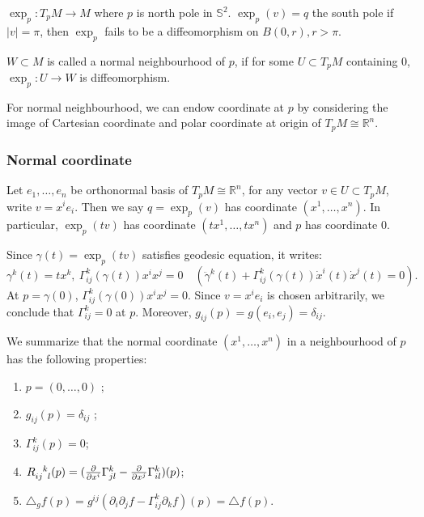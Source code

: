 \begin{example}
    \(\exp_p\colon T_p M\to M\) where \(p\) is north pole in \(\mathbb{S}^2\).
    \(\exp_p(v)=q\) the south pole if \(|v|=\pi\), then \(\exp_p\) fails to be a
    diffeomorphism on \(B(0,r),r>\pi\).
\end{example}

\begin{definition}
    \(W\subset M\) is called a normal neighbourhood of \(p\), if for some \(U\subset 
    T_p M\) containing 0, \(\exp_p\colon U\to W\) is diffeomorphism.
\end{definition}

For normal neighbourhood, we can endow coordinate at \(p\) by considering the image
of Cartesian coordinate and polar coordinate at origin of \(T_p M\cong \mathbb{R}^n\).

\subsubsection*{Normal coordinate}
Let \(e_1,\ldots,e_n\) be orthonormal basis of \(T_p M\cong \mathbb{R}^n\), for any
vector \(v\in U\subset T_p M\), write \(v=x^i e_i\).
Then we say \(q=\exp_p(v)\) has coordinate \((x^1,\ldots,x^n)\). In particular,
\(\exp_p(tv)\) has coordinate \((tx^1,\ldots,tx^n)\) and \(p\) has coordinate \(0\).

Since \(\gamma(t)=\exp_p(tv)\) satisfies geodesic equation, it writes: \[
    \gamma^k(t)=tx^k,\ \Gamma_{ij}^k(\gamma(t))x^i x^j=0\quad
    (\ddot \gamma^k(t)+\Gamma_{ij}^k(\gamma(t))\dot x^i(t)\dot x^j(t)=0)
.\] At \(p=\gamma(0)\), \(\Gamma_{ij}^k(\gamma(0))x^i x^j=0\). Since \(v=x^i e_i\) is
chosen arbitrarily, we conclude that \(\Gamma_{ij}^k=0\) at \(p\).
Moreover, \(g_{ij}(p)=g(e_i,e_j)=\delta_{ij}\).

We summarize that the normal coordinate \((x^1,\ldots,x^n)\) in a neighbourhood of 
\(p\) has the following properties:
\begin{enumerate}[(1)]
\item \(p=(0,\ldots,0)\) ;
\item \(g_{ij}(p)=\delta_{ij}\) ;
\item \(\Gamma_{ij}^k(p)=0\);
\item \(\tensor{R}{_{ij}^k_l}(p)=(\pdv{x^i}\Gamma_{jl}^k-\pdv{x^j}\Gamma_{il}^k)(p)\);
\item \(\triangle_g f(p)=g^{ij}(\partial_i \partial_j f-\Gamma_{ij}^k \partial_k f)(p)
    =\triangle f(p)\).
\end{enumerate}

